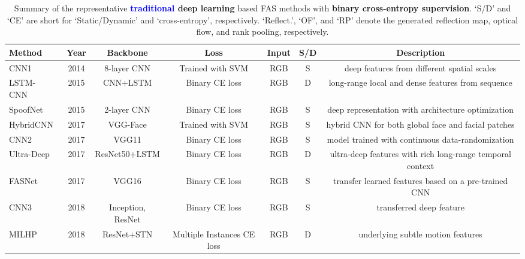 \documentclass[10pt,journal,compsoc]{IEEEtran}
\begin{document}
\begin{table}
\centering
\caption{Summary of the representative \textbf{\textcolor{blue}{traditional} deep learning} based FAS methods with \textbf{binary cross-entropy supervision}. `S/D' and `CE' are short for `Static/Dynamic' and `cross-entropy', respectively. `Reflect.', `OF', and `RP' denote the generated reflection map, optical flow, and rank pooling, respectively.} \label{tab:binaryloss}
\resizebox{1.0\textwidth}{!} {\begin{tabular}{l c c c c c c} 
 \toprule[1pt]
 Method & Year & Backbone & Loss & Input & S/D & Description \\
 

   \midrule
CNN1~\cite{yang2014learn} & 2014 & 8-layer CNN & Trained with SVM & RGB & S & deep features from different spatial scales  \\ 
 
 
 
   \midrule
LSTM-CNN~\cite{Xu2016Learning} & 2015 & CNN+LSTM  & Binary CE loss & RGB & D & long-range local and dense features from sequence \\ 
  

   \midrule
SpoofNet~\cite{menotti2015deep} & 2015 & 2-layer CNN  & Binary CE loss & RGB & S & deep representation with architecture optimization \\ 

   \midrule
HybridCNN~\cite{li2017face} & 2017 & VGG-Face  & Trained with SVM & RGB & S & hybrid CNN for both global face and facial patches \\ 


   \midrule
CNN2~\cite{nagpal2019performance} & 2017 & VGG11 & Binary CE loss & RGB & S & model trained with continuous data-randomization  \\ 


   \midrule
Ultra-Deep~\cite{tu2017ultra} & 2017 & ResNet50+LSTM & Binary CE loss & RGB & D & ultra-deep features with rich long-range temporal context \\ 

    \midrule
FASNet~\cite{lucena2017transfer} & 2017 & VGG16  & Binary CE loss & RGB & S & transfer learned features based on a pre-trained CNN \\ 
 

   \midrule
CNN3~\cite{rehman2017deep} & 2018 & Inception, ResNet & Binary CE loss & RGB & S & transferred deep feature  \\ 
 
 
  \midrule
 MILHP~\cite{lin2018live} & 2018 & ResNet+STN  & Multiple Instances CE loss & RGB & D & underlying subtle motion features\\ 



\end{tabular}}
\end{table}
\end{document}
